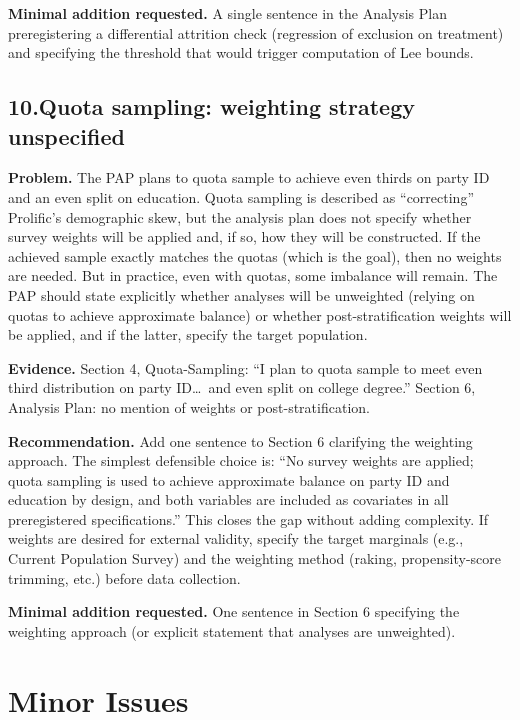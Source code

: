 \documentclass[11pt]{article}
\begin{document}
\textbf{Minimal addition requested.} A single sentence in the Analysis Plan preregistering a differential attrition check (regression of exclusion on treatment) and specifying the threshold that would trigger computation of Lee bounds.

\bigskip

\subsection*{10.\enspace Quota sampling: weighting strategy unspecified}

\textbf{Problem.} The PAP plans to quota sample to achieve even thirds on party ID and an even split on education. Quota sampling is described as ``correcting'' Prolific's demographic skew, but the analysis plan does not specify whether survey weights will be applied and, if so, how they will be constructed. If the achieved sample exactly matches the quotas (which is the goal), then no weights are needed. But in practice, even with quotas, some imbalance will remain. The PAP should state explicitly whether analyses will be unweighted (relying on quotas to achieve approximate balance) or whether post-stratification weights will be applied, and if the latter, specify the target population.

\textbf{Evidence.} Section 4, Quota-Sampling: ``I plan to quota sample to meet even third distribution on party ID\ldots\ and even split on college degree.'' Section 6, Analysis Plan: no mention of weights or post-stratification.

\textbf{Recommendation.} Add one sentence to Section 6 clarifying the weighting approach. The simplest defensible choice is: ``No survey weights are applied; quota sampling is used to achieve approximate balance on party ID and education by design, and both variables are included as covariates in all preregistered specifications.'' This closes the gap without adding complexity. If weights are desired for external validity, specify the target marginals (e.g., Current Population Survey) and the weighting method (raking, propensity-score trimming, etc.) before data collection.

\textbf{Minimal addition requested.} One sentence in Section 6 specifying the weighting approach (or explicit statement that analyses are unweighted).

\section{Minor Issues}
\end{document}
